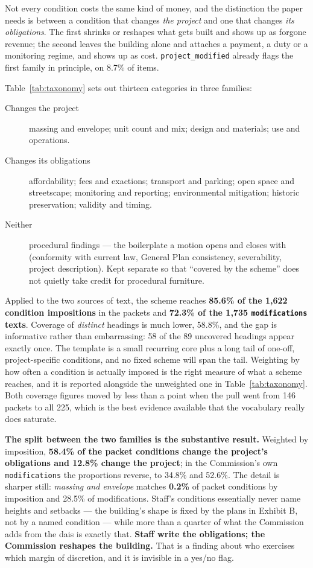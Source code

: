 \documentclass[11pt]{article}
\begin{document}
Not every condition costs the same kind of money, and the distinction the paper needs is
between a condition that changes \emph{the project} and one that changes \emph{its
obligations}. The first shrinks or reshapes what gets built and shows up as forgone revenue;
the second leaves the building alone and attaches a payment, a duty or a monitoring regime, and
shows up as cost. \texttt{project\_modified} already flags the first family in principle, on
8.7\% of items.

Table~\ref{tab:taxonomy} sets out thirteen categories in three families:

\begin{description}
\item[Changes the project] massing and envelope; unit count and mix; design and materials; use
and operations.
\item[Changes its obligations] affordability; fees and exactions; transport and parking; open
space and streetscape; monitoring and reporting; environmental mitigation; historic
preservation; validity and timing.
\item[Neither] procedural findings --- the boilerplate a motion opens and closes with
(conformity with current law, General Plan consistency, severability, project description).
Kept separate so that ``covered by the scheme'' does not quietly take credit for procedural
furniture.
\end{description}

Applied to the two sources of text, the scheme reaches \textbf{85.6\% of the 1{,}622 condition
impositions} in the packets and \textbf{72.3\% of the 1{,}735 \texttt{modifications} texts}.
Coverage of \emph{distinct} headings is much lower, 58.8\%, and the gap is informative rather
than embarrassing: 58 of the 89 uncovered headings appear exactly once. The template is a small
recurring core plus a long tail of one-off, project-specific conditions, and no fixed scheme
will span the tail. Weighting by how often a condition is actually imposed is the right measure
of what a scheme reaches, and it is reported alongside the unweighted one in
Table~\ref{tab:taxonomy}. Both coverage figures moved by less than a point when the pull went
from 146 packets to all 225, which is the best evidence available that the vocabulary really
does saturate.

\textbf{The split between the two families is the substantive result.} Weighted by imposition,
\textbf{58.4\% of the packet conditions change the project's obligations and 12.8\% change the
project}; in the Commission's own \texttt{modifications} the proportions reverse, to 34.8\%
and 52.6\%. The detail is sharper still: \emph{massing and envelope} matches
\textbf{0.2\%} of packet conditions by imposition and 28.5\% of modifications. Staff's
conditions essentially never name heights and setbacks --- the building's shape is fixed by
the plans in Exhibit B, not by a named condition --- while more than a quarter of what the
Commission adds from the dais is exactly that. \textbf{Staff write the obligations; the
Commission reshapes the building.} That is a finding about who exercises which margin of
discretion, and it is invisible in a yes/no flag.
\end{document}
